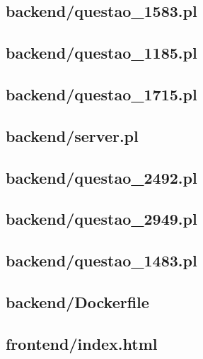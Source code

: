 \subsection*{backend/questao\_1583.pl}


\subsection*{backend/questao\_1185.pl}


\subsection*{backend/questao\_1715.pl}


\subsection*{backend/server.pl}


\subsection*{backend/questao\_2492.pl}


\subsection*{backend/questao\_2949.pl}


\subsection*{backend/questao\_1483.pl}


\subsection*{backend/Dockerfile}


\subsection*{frontend/index.html}


